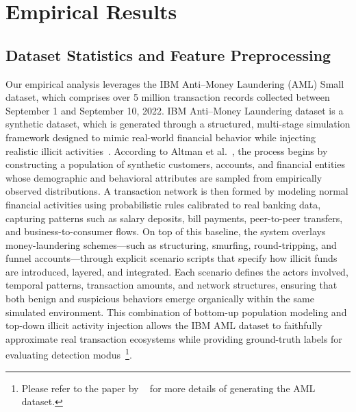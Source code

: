 \section{Empirical Results}

\subsection{Dataset Statistics and Feature Preprocessing}
Our empirical analysis leverages the IBM Anti–Money Laundering (AML) Small dataset, which comprises over 5 million transaction records collected between September 1 and September 10, 2022. IBM Anti–Money Laundering dataset is a synthetic dataset, which is generated through a structured, multi-stage simulation framework designed to mimic real-world financial behavior while injecting realistic illicit activities~\parencite{altman2023realistic}. According to Altman et al.~\parencite*{altman2023realistic}, the process begins by constructing a population of synthetic customers, accounts, and financial entities whose demographic and behavioral attributes are sampled from empirically observed distributions. A transaction network is then formed by modeling normal financial activities using probabilistic rules calibrated to real banking data, capturing patterns such as salary deposits, bill payments, peer-to-peer transfers, and business-to-consumer flows. On top of this baseline, the system overlays money-laundering schemes—such as structuring, smurfing, round-tripping, and funnel accounts—through explicit scenario scripts that specify how illicit funds are introduced, layered, and integrated. Each scenario defines the actors involved, temporal patterns, transaction amounts, and network structures, ensuring that both benign and suspicious behaviors emerge organically within the same simulated environment. This combination of bottom-up population modeling and top-down illicit activity injection allows the IBM AML dataset to faithfully approximate real transaction ecosystems while providing ground-truth labels for evaluating detection modus~\footnote{Please refer to the paper by ~\parencite{altman2023realistic} for more details of generating the AML dataset.}.

